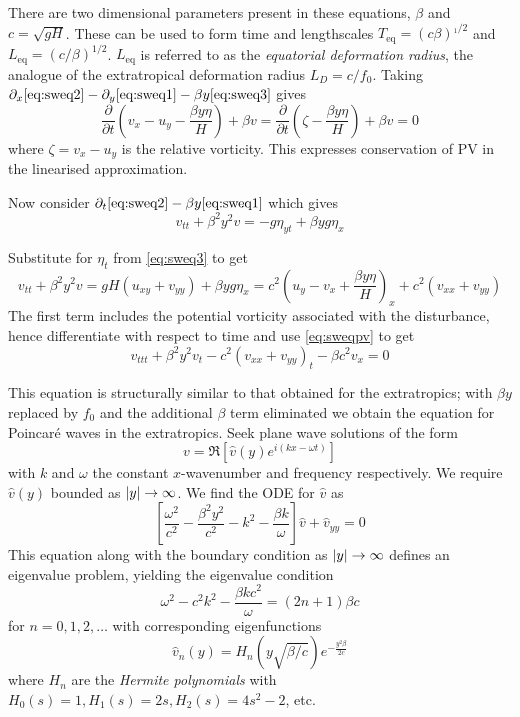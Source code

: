 \documentclass{jknotes}
\begin{document}
There are two dimensional parameters present in these equations, $\beta$ and
$c = \sqrt{gH}$. These can be used to form time and lengthscales
$T_{\text{eq}} = (c\beta)^{_1/2}$ and $L_{\text{eq}} = (c/\beta)^{1/2}$.
$L_{\text{eq}}$ is referred to as the \emph{equatorial deformation radius},
the analogue of the extratropical deformation radius $L_D = c/f_0$. Taking
$\partial_x \eqref{eq:sweq2} - \partial_y \eqref{eq:sweq1} - \beta y
\eqref{eq:sweq3}$ gives
\begin{equation}
	\frac{\partial}{\partial t} (v_x - u_y - \frac{\beta y \eta}{H}) + \beta v
	= \frac{\partial}{\partial t} ( \zeta - \frac{\beta y \eta}{H}) + \beta v
	= 0 \label{eq:sweqpv}
\end{equation}
where $\zeta = v_x - u_y$ is the relative vorticity. This expresses
conservation of PV in the linearised approximation.

Now consider $\partial_t \eqref{eq:sweq2} - \beta y \eqref{eq:sweq1}$ which
gives
\begin{equation}
	v_{tt} + \beta^2 y^2 v = -g \eta_{yt} + \beta y g \eta_x
\end{equation}

Substitute for $\eta_t$ from \eqref{eq:sweq3} to get
\begin{equation}
	v_{tt} + \beta^2 y^2 v = gH (u_{xy} + v_{yy}) + \beta y g \eta_x = c^2
	(u_y - v_x + \frac{\beta y \eta}{H})_x + c^2 (v_{xx} + v_{yy})
\end{equation}
The first term includes the potential vorticity associated with the
disturbance, hence differentiate with respect to time and use
\eqref{eq:sweqpv} to get
\begin{equation}
	v_{ttt} + \beta^2 y^2 v_t - c^2 (v_{xx} + v_{yy})_t - \beta c^2 v_x = 0
\end{equation}

This equation is structurally similar to that obtained for the extratropics;
with $\beta y$ replaced by $f_0$ and the additional $\beta$ term eliminated
we obtain the equation for Poincar\'{e} waves in the extratropics. Seek plane
wave solutions of the form
\begin{equation}
	v = \Re\left[ \hat{v}(y) e^{i(kx-\omega t)} \right]
\end{equation}
with $k$ and $\omega$ the constant $x$-wavenumber and frequency respectively.
We require $\hat{v}(y)$ bounded as $\abs{y} \to \infty$. We find the ODE for
$\hat{v}$ as
\begin{equation}
	\left[ \frac{\omega^2}{c^2} - \frac{\beta^2 y^2}{c^2} - k^2 - \frac{\beta
	k}{\omega} \right] \hat{v} + \hat{v}_{yy} = 0
\end{equation}
This equation along with the boundary condition as $\abs{y} \to \infty$
defines an eigenvalue problem, yielding the eigenvalue condition
\begin{equation}
	\omega^2 - c^2 k^2 - \frac{\beta k c^2}{\omega} = (2n+1) \beta c
\end{equation}
for $n = 0, 1, 2, \dots$ with corresponding eigenfunctions
\begin{equation}
	\hat{v}_n(y) = H_n( y\sqrt{\beta/c}) e^{-\frac{y^2 \beta}{2c}}
\end{equation}
where $H_n$ are the \emph{Hermite polynomials} with $H_0(s) = 1, H_1(s) = 2s,
H_2(s) = 4s^2 - 2$, etc.
\end{document}
